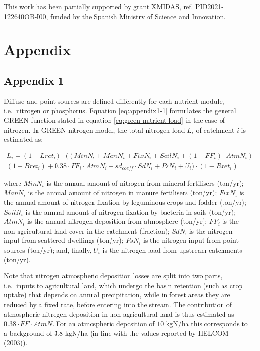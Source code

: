 This work has been partially supported by grant XMIDAS, ref. PID2021-122640OB-I00, funded by the Spanish Ministry of Science and Innovation.

\hypertarget{appendix}{%
\section{Appendix}\label{appendix}}

\hypertarget{appendix-1}{%
\subsection{Appendix 1}\label{appendix-1}}

Diffuse and point sources are defined differently for each nutrient module, i.e.~nitrogen or phosphorus. Equation \eqref{eq:appendix1-1} formulates the general GREEN function stated in equation \eqref{eq:green-nutrient-load} in the case of nitrogen. In GREEN nitrogen model, the total nitrogen load \(L_i\) of catchment \(i\) is estimated as:

\begin{equation}
\begin{split}
   L_i = (1 - Lret_i) \cdot ((MinN_i + ManN_i + FixN_i + SoilN_i + (1 - FF_i) \cdot AtmN_i) \cdot \\ (1 - Bret_i) + 0.38 \cdot FF_i \cdot AtmN_i + sd_{coeff} \cdot SdN_i + PsN_i + U_i) \cdot (1 - Rret_i)  
\end{split}
\label{eq:appendix1-1}
\end{equation}

\noindent where \(MinN_i\) is the annual amount of nitrogen from mineral fertilisers (ton/yr); \(ManN_i\) is the annual amount of nitrogen in manure fertilisers (ton/yr); \(FixN_i\) is the annual amount of nitrogen fixation by leguminous crops and fodder (ton/yr); \(SoilN_i\) is the annual amount of nitrogen fixation by bacteria in soils (ton/yr); \(AtmN_i\) is the annual nitrogen deposition from atmosphere (ton/yr); \(FF_i\) is the non-agricultural land cover in the catchment (fraction); \(SdN_i\) is the nitrogen input from scattered dwellings (ton/yr); \(PsN_i\) is the nitrogen input from point sources (ton/yr); and, finally, \(U_i\) is the nitrogen load from upstream catchments (ton/yr).

Note that nitrogen atmospheric deposition losses are split into two parts, i.e.~inputs to agricultural land, which undergo the basin retention (such as crop uptake) that depends on annual precipitation, while in forest areas they are reduced by a fixed rate, before entering into the stream. The contribution of atmospheric nitrogen deposition in non-agricultural land is thus estimated as \(0.38 \cdot FF \cdot AtmN\). For an atmospheric deposition of \(10\) kgN/ha this corresponds to a background of \(3.8\) kgN/ha (in line with the values reported by HELCOM (2003)).

